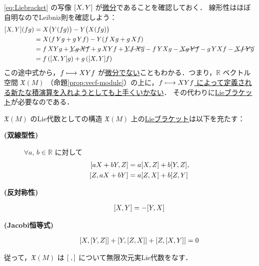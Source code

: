 \documentclass[TQFT_main]{subfiles}
\begin{document}
\eqref{eq:Liebracket} の写像 $\comm{X}{Y}$ が\hyperref[prop:vecf-derivation]{微分}であることを確認しておく．
線形性はほぼ自明なのでLeibniz則を確認しよう：
\begin{align}
    \comm{X}{Y}(fg) &= X \bigl( Y(fg) \bigr) - Y \bigl( X(fg) \bigr) \\
    &= X(f\, Yg + g\, Yf) - Y(f\, Xg + g\, Xf) \\
    &= f\, XYg + \cancel{Yg\, Xf} + g\, XYf + \cancel{Yf\, Xg} - f\, YXg - \cancel{Xg\, Yf} - g\, YXf - \cancel{Xf\, Yg} \\
    &= f\, (\comm{X}{Y}g) + g\, (\comm{X}{Y}f)
\end{align}
この途中式から，$f \longmapsto XY f$ が\underline{微分でない}こともわかる．つまり，$\mathbb{R}$ ベクトル空間 $\mathfrak{X}(M)$ （命題\ref{prop:vecf-module}）の上に，\underline{$f \longmapsto XYf$ によって定義される新たな積演算を入れようとしても上手くいかない}．
その代わりに\hyperref[def:Lie-bracket]{Lieブラケット}が必要なのである．

\begin{myprop}[label=prop:vecf-Liealg]{$\mathfrak{X}(M)$ のLie代数としての構造}
    $\mathfrak{X}(M)$ 上の\hyperref[def:Lie-bracket]{Lieブラケット}は以下を充たす：
    \begin{description}
        \item[\textbf{(双線型性)}] $\forall a,\, b \in \mathbb{R}$ に対して
        \begin{align}
            \comm{aX + bY}{Z} &= a\comm{X}{Z} + b \comm{Y}{Z}, \\
            \comm{Z}{aX + bY} &= a\comm{Z}{X} + b \comm{Z}{Y}
        \end{align}
        \item[\textbf{(反対称性)}] \begin{align}
            \comm{X}{Y} = - \comm{Y}{X}
        \end{align}
        \item[\textbf{(Jacobi恒等式)}] \begin{align}
            \comm{X}{\comm{Y}{Z}} + \comm{Y}{\comm{Z}{X}} + \comm{Z}{\comm{X}{Y}} = 0
        \end{align}        
    \end{description}
    従って，$\mathfrak{X}(M)$ は $\comm{\;}{\,}$ について無限次元実Lie代数をなす．
\end{myprop}
\end{document}
